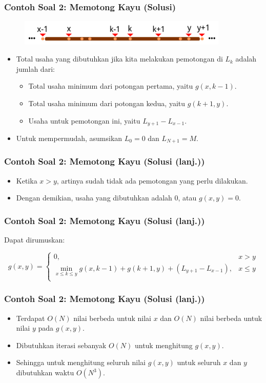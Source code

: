 \begin{frame}
\frametitle{Contoh Soal 2: Memotong Kayu (Solusi)}
\begin{figure}
  \includegraphics[width=10cm]{asset/cutting-stick-4.pdf}
\end{figure}
\begin{itemize}
  \item Total usaha yang dibutuhkan jika kita melakukan pemotongan di $L_k$ adalah jumlah dari:
  \begin{itemize}
    \item Total usaha minimum dari potongan pertama, yaitu $g(x,k-1)$.
    \item Total usaha minimum dari potongan kedua, yaitu $g(k+1,y)$.
    \item Usaha untuk pemotongan ini, yaitu $L_{y+1} - L_{x-1}$.
  \end{itemize}
  \item Untuk mempermudah, asumsikan $L_0 = 0$ dan $L_{N+1} = M$.
\end{itemize}
\end{frame}

\begin{frame} 
\frametitle{Contoh Soal 2: Memotong Kayu (Solusi (lanj.))}
\begin{itemize}
  \item Ketika $x>y$, artinya sudah tidak ada pemotongan yang perlu dilakukan.
  \item Dengan demikian, usaha yang dibutuhkan adalah 0, atau $g(x,y) = 0$.
\end{itemize}
\end{frame}

\begin{frame} 
\frametitle{Contoh Soal 2: Memotong Kayu (Solusi (lanj.))}
Dapat dirumuskan:
\begin{small}
\[g(x,y) = \left\{\begin{array}{lr}
    0, & x>y\\
    \min_{x \leq k \leq y} g(x,k-1) + g(k+1,y) + (L_{y+1} - L_{x-1}), & x \leq y \\
    \end{array}\right.\]
\end{small}
\end{frame}

\begin{frame} 
\frametitle{Contoh Soal 2: Memotong Kayu (Solusi (lanj.))}
\begin{itemize}
  \item Terdapat $O(N)$ nilai berbeda untuk nilai $x$ dan $O(N)$ nilai berbeda untuk nilai $y$ pada $g(x,y)$.
  \item Dibutuhkan iterasi sebanyak $O(N)$ untuk menghitung $g(x,y)$. 
  \item Sehingga untuk menghitung seluruh nilai $g(x,y)$ untuk seluruh $x$ dan $y$ dibutuhkan waktu $O(N^3)$.
\end{itemize}
\end{frame}

